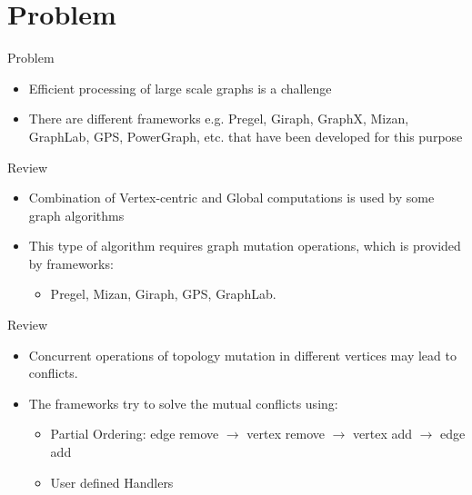 \section{Problem}
\begin{frame}{Problem}
  \begin{itemize}
    \item Efficient processing of large scale graphs is a challenge
    \item  There are different frameworks e.g. Pregel, Giraph, GraphX, Mizan, GraphLab, GPS, PowerGraph, etc. that have been developed for this purpose
  \end{itemize}
  \end{frame}

  \begin{frame}{Review}
    \begin{itemize}
    \item Combination of Vertex-centric and Global computations is used by some graph algorithms
    \item This type of algorithm requires graph mutation operations, which is provided by frameworks:
        \begin{itemize}
          \item Pregel, Mizan, Giraph, GPS, GraphLab.
        \end{itemize}
      \end{itemize}
    \end{frame}

    \begin{frame}{Review}
    \begin{itemize}
      \item Concurrent operations of topology mutation in different vertices may lead to conflicts.
      \item The frameworks try to solve the mutual conflicts using:
          \begin{itemize}
            \item Partial Ordering: edge remove $\rightarrow$ vertex remove $\rightarrow$ vertex add $\rightarrow$ edge add
            \item User defined Handlers
          \end{itemize}
  \end{itemize}
\end{frame}
